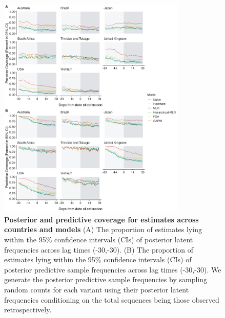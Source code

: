 \begin{figure}[th!]
	\centering
	\includegraphics[width=0.8\textwidth]{supp_figures/coverage_supp_2.png}
	\caption[\textbf{Posterior and predictive coverage for estimates across countries and models}]{
		\textbf{Posterior and predictive coverage for estimates across countries and models}
		(A) The proportion of estimates lying within the 95\% confidence intervals (CIs) of posterior latent frequencies across lag times (-30,-30).
		(B) The proportion of estimates lying within the 95\% confidence intervals (CIs) of posterior predictive sample frequencies across lag times (-30,-30).
		We generate the posterior predictive sample frequencies by sampling random counts for each variant using their posterior latent frequencies conditioning on the total sequences being those observed retrospectively.
	}
	\label{fig:S8}
\end{figure}


